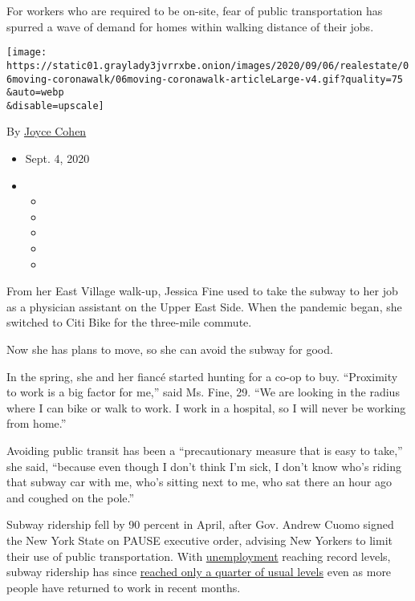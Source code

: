 For workers who are required to be on-site, fear of public
transportation has spurred a wave of demand for homes within walking
distance of their jobs.

\texttt{[image: https://static01.graylady3jvrrxbe.onion/images/2020/09/06/realestate/06moving-coronawalk/06moving-coronawalk-articleLarge-v4.gif?quality=75\\\&auto=webp\\\&disable=upscale]}

By \href{https://www.nytimes3xbfgragh.onion/by/joyce-cohen}{Joyce Cohen}

\begin{itemize}
\item
  Sept. 4, 2020
\item
  \begin{itemize}
  \item
  \item
  \item
  \item
  \item
  \end{itemize}
\end{itemize}

From her East Village walk-up, Jessica Fine used to take the subway to
her job as a physician assistant on the Upper East Side. When the
pandemic began, she switched to Citi Bike for the three-mile commute.

Now she has plans to move, so she can avoid the subway for good.

In the spring, she and her fiancé started hunting for a co-op to buy.
``Proximity to work is a big factor for me,'' said Ms. Fine, 29. ``We
are looking in the radius where I can bike or walk to work. I work in a
hospital, so I will never be working from home.''

Avoiding public transit has been a ``precautionary measure that is easy
to take,'' she said, ``because even though I don't think I'm sick, I
don't know who's riding that subway car with me, who's sitting next to
me, who sat there an hour ago and coughed on the pole.''

Subway ridership fell by 90 percent in April, after Gov. Andrew Cuomo
signed the New York State on PAUSE executive order, advising New Yorkers
to limit their use of public transportation. With
\href{https://www.nytimes3xbfgragh.onion/2020/07/07/nyregion/nyc-unemployment.html}{unemployment}
reaching record levels, subway ridership has since
\href{https://www.nytimes3xbfgragh.onion/2020/08/26/nyregion/nyc-subway-bus-service-cuts.html}{reached
only a quarter of usual levels} even as more people have returned to
work in recent months.

